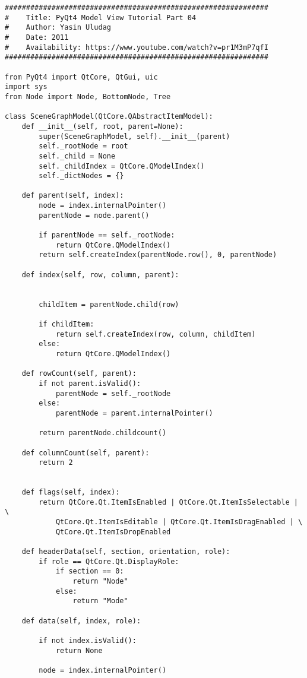 \begin{verbatim}
##############################################################    
#    Title: PyQt4 Model View Tutorial Part 04
#    Author: Yasin Uludag
#    Date: 2011
#    Availability: https://www.youtube.com/watch?v=pr1M3mP7qfI
##############################################################

from PyQt4 import QtCore, QtGui, uic
import sys
from Node import Node, BottomNode, Tree

class SceneGraphModel(QtCore.QAbstractItemModel):
    def __init__(self, root, parent=None):
        super(SceneGraphModel, self).__init__(parent)
        self._rootNode = root
        self._child = None
        self._childIndex = QtCore.QModelIndex()
        self._dictNodes = {}

    def parent(self, index):
        node = index.internalPointer()
        parentNode = node.parent()

        if parentNode == self._rootNode:
            return QtCore.QModelIndex()
        return self.createIndex(parentNode.row(), 0, parentNode)

    def index(self, row, column, parent):


        childItem = parentNode.child(row)

        if childItem:
            return self.createIndex(row, column, childItem)
        else:
            return QtCore.QModelIndex()

    def rowCount(self, parent):
        if not parent.isValid():
            parentNode = self._rootNode
        else:
            parentNode = parent.internalPointer()

        return parentNode.childcount()

    def columnCount(self, parent):
        return 2

    
    def flags(self, index):
        return QtCore.Qt.ItemIsEnabled | QtCore.Qt.ItemIsSelectable | \
            QtCore.Qt.ItemIsEditable | QtCore.Qt.ItemIsDragEnabled | \
            QtCore.Qt.ItemIsDropEnabled

    def headerData(self, section, orientation, role):
        if role == QtCore.Qt.DisplayRole:
            if section == 0:
                return "Node"
            else:
                return "Mode"

    def data(self, index, role):

        if not index.isValid():
            return None

        node = index.internalPointer()


\end{verbatim}
